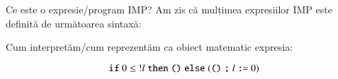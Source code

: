 \documentclass[xcolor=pdftex,romanian,colorlinks]{beamer}
\begin{document}
\begin{frame}{Ce este o expresie/program IMP?}
Am zis că mulțimea expresiilor IMP este definită de următoarea sintaxă:
\vspace{-5ex}\begin{syntaxBlock}{\AExp}
\alert{
\begin{itemize}
\item[]\renewcommand{\syntaxKeyword}{}
\syntax{\Int\Smid\terminal{!}\Id \Smid \AExp\iop \AExp}{}
\item[]\renewcommand{\defSort}{\BExp}
\syntax{\Bool \Smid \AExp\bop \AExp}{}
\item[]\renewcommand{\defSort}{\Stmt}
\syntax{\Sskip \Smid \Id \terminal{:=} \AExp \Smid  \Stmt\terminal{;}\Stmt}{}
\syntaxCont{\Sif\BExp\Sthen \Block\Selse\Block \Smid \Swhile \BExp\Sdo \Block}{}
\item[]\renewcommand{\defSort}{\Pgm}
\syntax{\AExp \Smid \BExp \Smid \Stmt}{} 
\end{itemize}
}
\end{syntaxBlock}

Cum interpretăm/cum reprezentăm ca obiect matematic expresia:

\[\mathrel{\text{\ttfamily if}} 0 \leq {!l} \mathrel{\text{\ttfamily then}} {\mathrel{\text{\ttfamily ()}}} \mathrel{\text{\ttfamily else}} ({\mathrel{\text{\ttfamily ()}}} \mathrel{\text{\ttfamily ;}} {l \mathrel{\text{\ttfamily :=}} 0})\]  

\end{frame}
\end{document}
